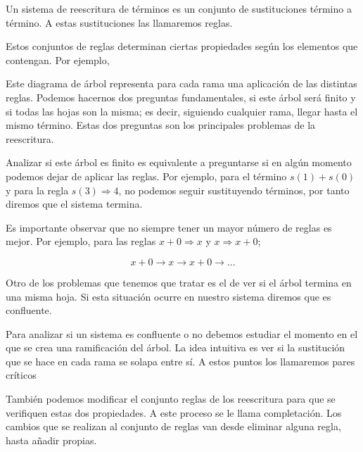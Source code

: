Un sistema de reescritura de términos es un conjunto de sustituciones
término a término. A estas sustituciones las llamaremos reglas.

Estos conjuntos de reglas determinan ciertas propiedades según los
elementos que contengan. Por ejemplo,

\begin{figure}[h]
  \centering
\end{figure}

Este diagrama de árbol representa para cada rama una aplicación de las
distintas reglas. Podemos hacernos dos preguntas fundamentales, si
este árbol será finito y si todas las hojas son la misma; es decir,
siguiendo cualquier rama, llegar hasta el mismo término. Estas dos
preguntas son los principales problemas de la reescritura.

Analizar si este árbol es finito es equivalente a preguntarse si en
algún momento podemos dejar de aplicar las reglas. Por ejemplo, para
el término $s(1) + s(0)$ y para la regla $s(3) \Rightarrow 4$, no
podemos seguir sustituyendo términos, por tanto diremos que el sistema
termina.

Es importante observar que no siempre tener un mayor número de reglas
es mejor. Por ejemplo, para las reglas $ x + 0 \Rightarrow x$ y
$x \Rightarrow x + 0$;

\[
  x + 0 \longrightarrow x \longrightarrow x+0 \longrightarrow \dots
\]

Otro de los problemas que tenemos que tratar es el de ver si el árbol
termina en una misma hoja. Si esta situación ocurre en nuestro sistema
diremos que es confluente.

Para analizar si un sistema es confluente o no debemos estudiar el
momento en el que se crea una ramificación del árbol. La idea
intuitiva es ver si la sustitución que se hace en cada rama se solapa
entre sí. A estos puntos los llamaremos pares críticos

También podemos modificar el conjunto reglas de los reescritura para
que se verifiquen estas dos propiedades. A este proceso se le llama
completación. Los cambios que se realizan al conjunto de reglas van
desde eliminar alguna regla, hasta añadir propias.

